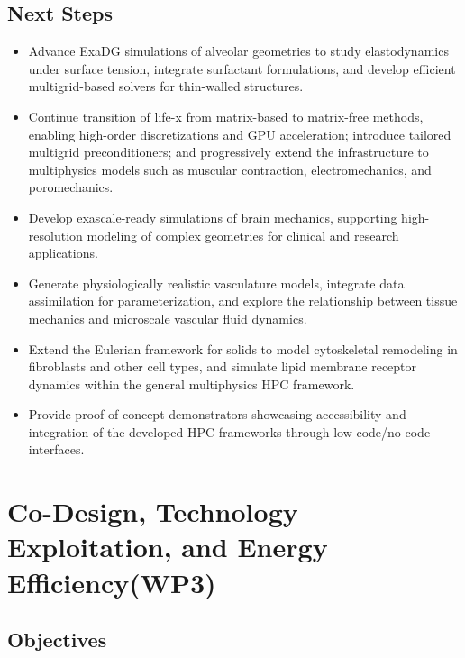 \documentclass[a4paper,12pt, numbers]{article}
\begin{document}
\subsection{Next Steps} %
\begin{itemize}[left=1em, itemsep=0pt, topsep=0pt]
\item Advance ExaDG simulations of alveolar geometries to study elastodynamics under surface tension, integrate surfactant formulations, and develop efficient multigrid-based solvers for thin-walled structures.

\item Continue transition of life-x from matrix-based to matrix-free methods, enabling high-order discretizations and GPU acceleration; introduce tailored multigrid preconditioners; and progressively extend the infrastructure to multiphysics models such as muscular contraction, electromechanics, and poromechanics.

\item Develop exascale-ready simulations of brain mechanics, supporting high-resolution modeling of complex geometries for clinical and research applications.

\item Generate physiologically realistic vasculature models, integrate data assimilation for parameterization, and explore the relationship between tissue mechanics and microscale vascular fluid dynamics.

\item Extend the Eulerian framework for solids to model cytoskeletal remodeling in fibroblasts and other cell types, and simulate lipid membrane receptor dynamics within the general multiphysics HPC framework.

\item Provide proof-of-concept demonstrators showcasing accessibility and integration of the developed HPC frameworks through low-code/no-code interfaces.
\end{itemize}


\newpage

\section{{Co-Design, Technology Exploitation, and Energy Efficiency(WP3)}}
\label{sec:wp3_codesign}

\subsection{Objectives}
\end{document}

